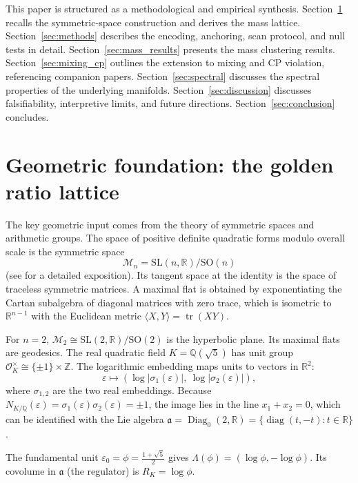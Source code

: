 ﻿\documentclass[12pt]{article}
\theoremstyle{definition}
\begin{document}
This paper is structured as a methodological and empirical synthesis. Section~\ref{sec:geom} recalls the symmetric-space construction and derives the mass lattice. Section~\ref{sec:methods} describes the encoding, anchoring, scan protocol, and null tests in detail. Section~\ref{sec:mass_results} presents the mass clustering results. Section~\ref{sec:mixing_cp} outlines the extension to mixing and CP violation, referencing companion papers. Section~\ref{sec:spectral} discusses the spectral properties of the underlying manifolds. Section~\ref{sec:discussion} discusses falsifiability, interpretive limits, and future directions. Section~\ref{sec:conclusion} concludes.

\section{Geometric foundation: the golden ratio lattice}
\label{sec:geom}

The key geometric input comes from the theory of symmetric spaces and arithmetic groups. The space of positive definite quadratic forms modulo overall scale is the symmetric space
\[
\mathcal{M}_n = \mathrm{SL}(n,\mathbb{R})/\mathrm{SO}(n)
\]
(see \cite{Gentry:ShapeSpace} for a detailed exposition). Its tangent space at the identity is the space of traceless symmetric matrices. A maximal flat is obtained by exponentiating the Cartan subalgebra of diagonal matrices with zero trace, which is isometric to $\mathbb{R}^{n-1}$ with the Euclidean metric $\langle X,Y\rangle = \operatorname{tr}(XY)$.

For $n=2$, $\mathcal{M}_2 \cong \mathrm{SL}(2,\mathbb{R})/\mathrm{SO}(2)$ is the hyperbolic plane. Its maximal flats are geodesics. The real quadratic field $K = \mathbb{Q}(\sqrt5)$ has unit group $\mathcal{O}_K^\times \cong \{\pm1\}\times\mathbb{Z}$. The logarithmic embedding maps units to vectors in $\mathbb{R}^2$:
\[
\varepsilon \longmapsto (\log|\sigma_1(\varepsilon)|,\ \log|\sigma_2(\varepsilon)|),
\]
where $\sigma_{1,2}$ are the two real embeddings. Because $N_{K/\mathbb{Q}}(\varepsilon)= \sigma_1(\varepsilon)\sigma_2(\varepsilon) = \pm1$, the image lies in the line $x_1+x_2=0$, which can be identified with the Lie algebra $\mathfrak{a} = \operatorname{Diag}_0(2,\mathbb{R}) = \{\operatorname{diag}(t,-t) : t\in\mathbb{R}\}$.

The fundamental unit $\varepsilon_0 = \phi = \frac{1+\sqrt5}{2}$ gives $\Lambda(\phi)= (\log\phi, -\log\phi)$. Its covolume in $\mathfrak{a}$ (the regulator) is $R_K = \log\phi$.
\end{document}
